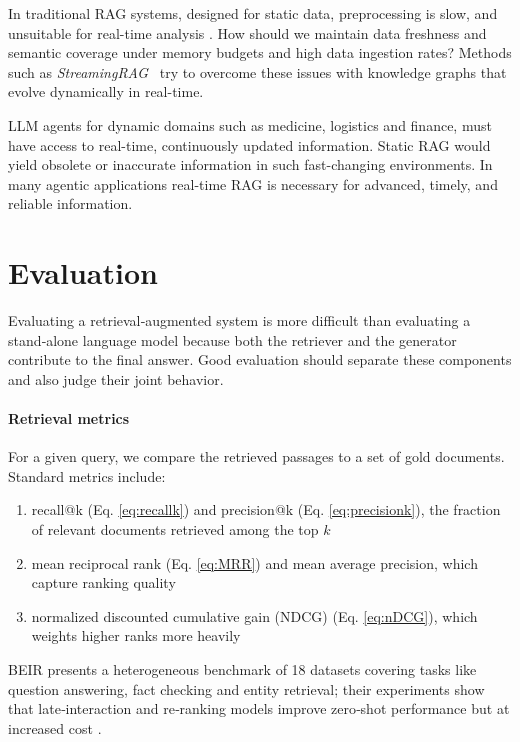 In traditional RAG systems, designed for static data,  preprocessing is slow, and unsuitable for real-time analysis \citep{zhu2025staticdynamicstreamingrag,sankaradas2025streamingragrealtimecontextualretrieval}. %
How should we maintain data freshness and semantic coverage under memory budgets and high data ingestion rates? Methods such as \emph{StreamingRAG}~\citep{sankaradas2025streamingragrealtimecontextualretrieval} try to overcome these issues with knowledge graphs that evolve dynamically in real-time.

LLM agents for dynamic domains such as medicine, logistics and finance, %
must have access to real-time, continuously updated information. Static RAG would yield  obsolete or inaccurate information in such fast-changing environments. In many agentic applications real-time RAG is necessary for advanced, timely, and reliable information.


\section{Evaluation}\label{sec:r_evaluation}
Evaluating a retrieval‑augmented system is more difficult than evaluating a stand‑alone language model because both the retriever and the generator contribute to the final answer.  Good evaluation should separate these components and also judge their joint behavior.

\paragraph{Retrieval metrics}  For a given query, we compare the retrieved passages to a set of gold documents.  Standard metrics include:
\begin{enumerate}
    \item recall@k (Eq. \ref{eq:recallk}) and precision@k (Eq. \ref{eq:precisionk}), the fraction of relevant documents retrieved among the top $k$ 
    \item mean reciprocal rank (Eq. \ref{eq:MRR})
    and mean average precision, which capture ranking quality
    \item normalized discounted cumulative gain (NDCG) (Eq. \ref{eq:nDCG}), which weights higher ranks more heavily
\end{enumerate}
BEIR presents a heterogeneous benchmark of 18 datasets covering tasks like question answering, fact checking and entity retrieval; their experiments show that late‑interaction and re‑ranking models improve zero‑shot performance but at increased cost \citep{thakur2021beir}.  

